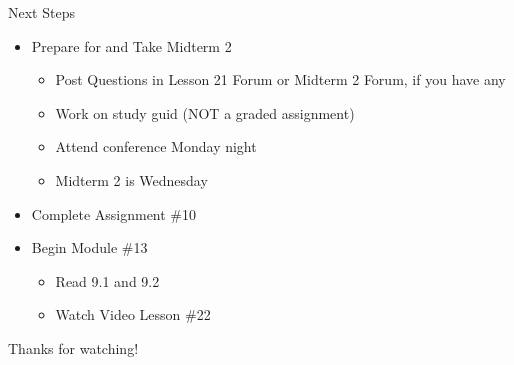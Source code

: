 \documentclass[t, aspectratio=169]{beamer}
\begin{document}
	\begin{frame}{Next Steps}
		\begin{itemize}
			\item Prepare for and Take Midterm 2
			\begin{itemize}
				\item Post Questions in Lesson 21 Forum or Midterm 2 Forum, if you have any
				\item Work on study guid (NOT a graded assignment)
				\item Attend conference Monday night
				\item Midterm 2 is Wednesday
			\end{itemize}
			\item Complete Assignment \#10
			\item Begin Module \#13
			\begin{itemize}
				\item Read 9.1 and 9.2
				\item Watch Video Lesson \#22
			\end{itemize}
		\end{itemize}
	
		\vfill
		
		Thanks for watching!
	\end{frame}
	
\end{document}
